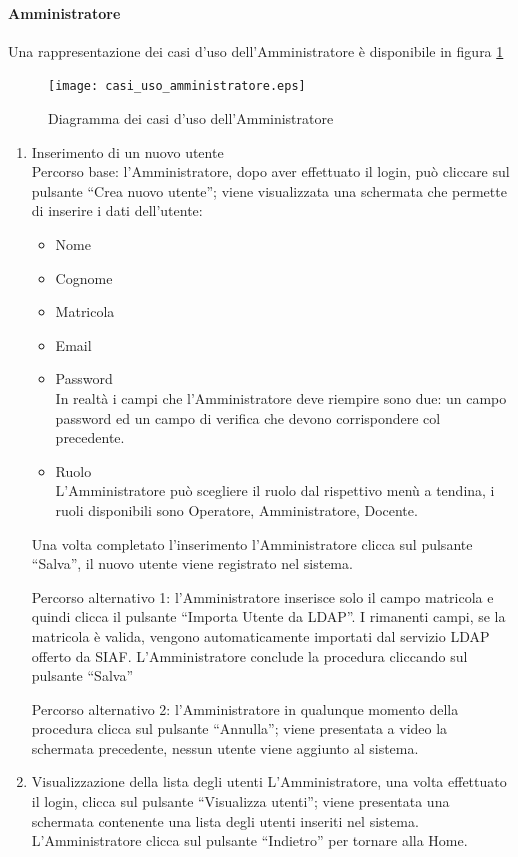 \paragraph{Amministratore}
Una rappresentazione dei casi d'uso dell'Amministratore è disponibile in figura \ref{use_case_diag_admin}
\begin{figure}[h]
  \caption{Diagramma dei casi d'uso dell'Amministratore}
  \label{use_case_diag_admin}
  \centering
    \texttt{[image: casi\_uso\_amministratore.eps]}
\end{figure}


\begin{enumerate}
 \item Inserimento di un nuovo utente\\
 
 
 Percorso base:
 l'Amministratore, dopo aver effettuato il login, può cliccare sul pulsante ``Crea nuovo utente''; viene visualizzata una schermata che permette
 di inserire i dati dell'utente:
 \begin{itemize}
  \item Nome
  \item Cognome
  \item Matricola
  \item Email
  \item	Password\\
    In realtà i campi che l'Amministratore deve riempire sono due: un campo password ed un campo di verifica che devono corrispondere col precedente.
  \item Ruolo\\
    L'Amministratore può scegliere il ruolo dal rispettivo menù a tendina, i ruoli disponibili sono Operatore, Amministratore, Docente.
 \end{itemize}
 
 Una volta completato l'inserimento l'Amministratore clicca sul pulsante ``Salva'', il nuovo utente viene registrato nel sistema. 

 Percorso alternativo 1:
 l'Amministratore inserisce solo il campo matricola e quindi clicca il pulsante ``Importa Utente da LDAP''. I rimanenti campi, se la matricola è valida,
 vengono automaticamente importati dal servizio LDAP offerto da SIAF. L'Amministratore conclude la procedura cliccando sul pulsante ``Salva''
 
 Percorso alternativo 2:
 l'Amministratore in qualunque momento della procedura clicca sul pulsante ``Annulla''; viene presentata a video la schermata precedente,
 nessun utente viene aggiunto al sistema.
 
 \item Visualizzazione della lista degli utenti
  L'Amministratore, una volta effettuato il login, clicca sul pulsante ``Visualizza utenti''; viene presentata una schermata contenente una lista  degli
  utenti inseriti nel sistema. L'Amministratore clicca sul pulsante ``Indietro'' per tornare alla Home.
\end{enumerate}

